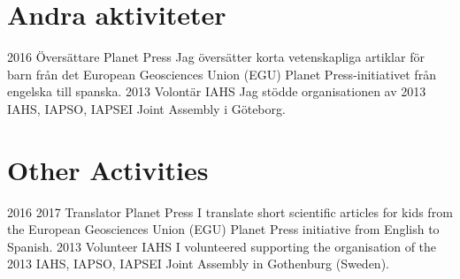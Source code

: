 \ifswedish
  \section{Andra aktiviteter}
      \position
          {2016 \textemdash{}}
          {Översättare}
          {Planet Press}
          {Jag översätter korta vetenskapliga artiklar för barn från det European Geosciences Union (EGU) Planet Press-initiativet från engelska till spanska.}
      \position
          {2013}
          {Volontär}
          {IAHS}
          {Jag stödde organisationen av 2013 IAHS, IAPSO, IAPSEI Joint Assembly i Göteborg.}
\else
  \section{Other Activities}
      \position
          {2016 \textemdash{} 2017}
          {Translator}
          {Planet Press}
          {I translate short scientific articles for kids from the European Geosciences Union (EGU) Planet Press initiative from English to Spanish.}
      \position
          {2013}
          {Volunteer}
          {IAHS}
          {I volunteered supporting the organisation of the 2013 IAHS, IAPSO, IAPSEI Joint Assembly in Gothenburg (Sweden).}
\fi
